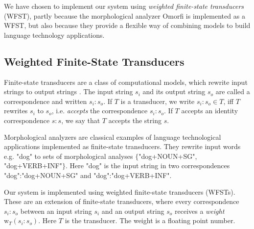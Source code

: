 \documentclass[a4paper,conference]{IEEEtran}
\begin{document}
We have chosen to implement our system using {\it weighted finite-state
transducers} (WFST), partly because the morphological analyzer Omorfi is
implemented as a WFST, but also because they provide a flexible way of
combining models to build language technology applications.

\subsection{Weighted Finite-State Transducers}


Finite-state transducers are a class of computational models, which
rewrite input strings to output strings \cite{beesley/2003}. The input
string $s_i$ and its output string $s_o$ are called a correspondence
and written $s_i\mathrm{:}s_o$. If $T$ is a transducer, we write
$s_i\mathrm{:}s_o \in T$, iff $T$ rewrites $s_i$ to $s_o$, i.e. {\it
  accepts} the correspondence $s_i\mathrm{:}s_o$. If $T$ accepts an
identity correspondence $s\mathrm{:}s$, we say that $T$ accepts the
string $s$.

Morphological analyzers are classical examples of language
technological applications implemented as finite-state
transducers. They rewrite input words e.g. "dog" to sets of
morphological analyses $\{$"dog+NOUN+SG", "dog+VERB+INF"$\}$. Here
"dog" is the input string in two correspondences "dog":"dog+NOUN+SG"
and "dog":"dog+VERB+INF".

Our system is implemented using weighted finite-state transducers
(WFSTs). These are an extension of finite-state transducers, where
every correspondence $s_i\mathrm{:}s_o$ between an input string $s_i$
and an output string $s_o$ receives a {\it weight} $\mathrm{w}_T(s_i\mathrm{:}s_o)$. Here $T$ is the transducer. The weight is a floating point number. 
\end{document}
